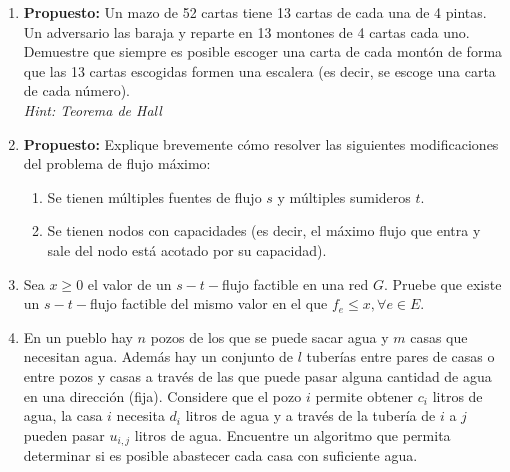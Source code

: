 \begin{enumerate}[label ={\bf P\arabic*}]
    \item \textbf{Propuesto:} Un mazo de 52 cartas tiene 13 cartas de cada una de 4 pintas. Un adversario las baraja y reparte en 13 montones de 4 cartas cada uno. Demuestre que siempre es posible escoger una carta de cada montón de forma que las 13 cartas escogidas formen una escalera (es decir, se escoge una carta de cada número).
    \\ \textit{Hint: Teorema de Hall}

	\item \textbf{Propuesto:} Explique brevemente cómo resolver las siguientes modificaciones del problema de flujo máximo:\begin{enumerate}
        \item Se tienen múltiples fuentes de flujo $s$ y múltiples sumideros $t$.
        \item Se tienen nodos con capacidades (es decir, el máximo flujo que entra y sale del nodo está acotado por su capacidad).
    \end{enumerate}

    \item Sea $x\geq 0$ el valor de un $s-t-$flujo factible en una red $G$. Pruebe que existe un $s-t-$flujo factible del mismo valor en el que $f_e\leq x, \forall e \in E$.
    
    \item En un pueblo hay $n$ pozos de los que se puede sacar agua y $m$ casas que necesitan agua. Además hay un conjunto de $l$ tuberías entre pares de casas o entre pozos y casas a través de las que puede pasar alguna cantidad de agua en una dirección (fija). Considere que el pozo $i$ permite obtener $c_i$ litros de agua, la casa $i$ necesita $d_i$ litros de agua y a través de la tubería de $i$ a $j$ pueden pasar $u_{i,j}$ litros de agua. Encuentre un algoritmo que permita determinar si es posible abastecer cada casa con suficiente agua.

\end{enumerate}
